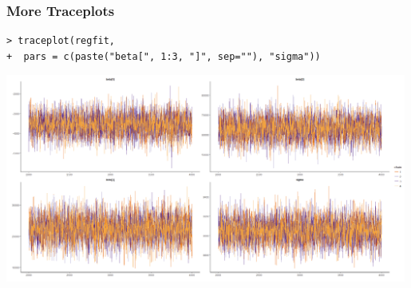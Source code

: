 \documentclass[xcolor=dvipsnames]{beamer}
\begin{document}

\begin{frame}[fragile]
\frametitle{More Traceplots}
\begin{verbatim}
> traceplot(regfit,
+  pars = c(paste("beta[", 1:3, "]", sep=""), "sigma"))
\end{verbatim}
\begin{center}
\includegraphics[width = 0.99\textwidth]{regtrace2.png}
\end{center}
\end{frame}
\end{document}
